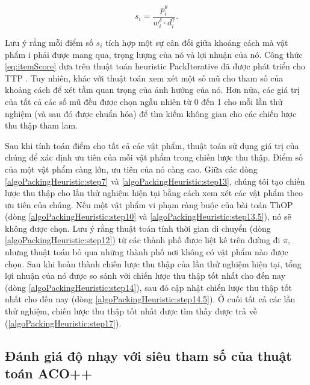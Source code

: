 \begin{equation}\label{eq:itemScore}
    s_i = \frac{p_i^\theta}{w_i^\delta \cdot d_i^\gamma}.
\end{equation}

Lưu ý rằng mỗi điểm số $s_i$ tích hợp một sự cân đối giữa khoảng cách mà vật phẩm i phải được mang qua, trọng lượng của nó và lợi nhuận của nó. Công thức \ref{eq:itemScore} dựa trên thuật toán heuristic PackIterative đã được phát triển cho TTP \cite{10.1145/2739480.2754716}. Tuy nhiên, khác với \cite{10.1145/2739480.2754716} thuật toán xem xét một số mũ cho tham số của khoảng cách để xét tầm quan trọng của ảnh hưởng của nó. Hơn nữa, các giá trị của tất cả các số mũ đều được chọn ngẫu nhiên từ 0 đến 1 cho mỗi lần thử nghiệm (và sau đó được chuẩn hóa) để tìm kiếm không gian cho các chiến lược thu thập tham lam.

Sau khi tính toán điểm cho tất cả các vật phẩm, thuật toán sử dụng giá trị của chúng để xác định ưu tiên của mỗi vật phẩm trong chiến lược thu thập. Điểm số của một vật phẩm càng lớn, ưu tiên của nó càng cao. Giữa các dòng \ref{algoPackingHeuristic:step7} và \ref{algoPackingHeuristic:step13}, chúng tôi tạo chiến lược thu thập cho lần thử nghiệm hiện tại bằng cách xem xét các vật phẩm theo ưu tiên của chúng. Nếu một vật phẩm vi phạm ràng buộc của bài toán ThOP (dòng \ref{algoPackingHeuristic:step10} và \ref{algoPackingHeuristic:step13.5}), nó sẽ không được chọn. Lưu ý rằng thuật toán tính thời gian di chuyển (dòng \ref{algoPackingHeuristic:step12}) từ các thành phố được liệt kê trên đường đi $\pi$, nhưng thuật toán bỏ qua những thành phố nơi không có vật phẩm nào được chọn. Sau khi hoàn thành chiến lược thu thập của lần thử nghiệm hiện tại, tổng lợi nhuận của nó được so sánh với chiến lược thu thập tốt nhất cho đến nay (dòng \ref{algoPackingHeuristic:step14}), sau đó cập nhật chiến lược thu thập tốt nhất cho đến nay (dòng \ref{algoPackingHeuristic:step14.5}). Ở cuối tất cả các lần thử nghiệm, chiến lược thu thập tốt nhất được tìm thấy được trả về (\ref{algoPackingHeuristic:step17}).

\subsection{Đánh giá độ nhạy với siêu tham số của thuật toán ACO++}  \label{section:ACO++Sensitive}

